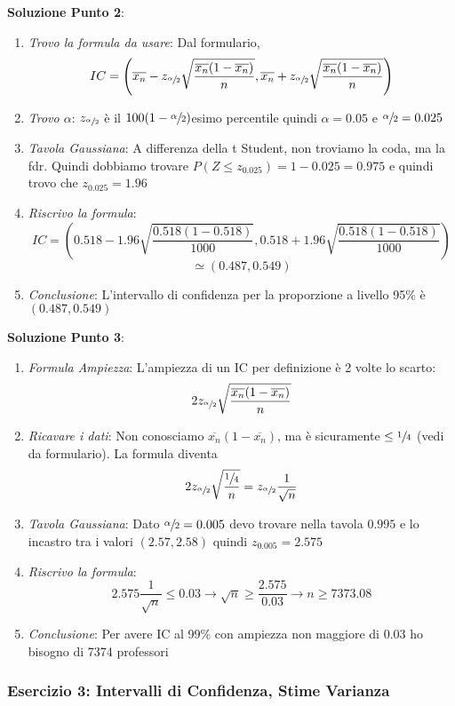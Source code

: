 \ind \textbf{Soluzione Punto 2}:
\begin{enumerate}
    \item \textit{Trovo la formula da usare}: Dal formulario, $$IC = \left(\overline{x_n} - z_{\sfrac{\alpha}{2}} \sqrt{\dfrac{\overline{x_n}(1 -\overline{x_n})}{n}}, \overline{x_n} + z_{\sfrac{\alpha}{2}} \sqrt{\dfrac{\overline{x_n}(1 -\overline{x_n})}{n}} \right)$$
    \item \textit{Trovo $\alpha$}: $z_{\sfrac{\alpha}{2}} $ è il $100(1 - \sfrac{\alpha}{2})$esimo percentile quindi $\alpha=0.05$ e $\sfrac{\alpha}{2}=0.025$
    \item \textit{Tavola Gaussiana}: A differenza della t Student, non troviamo la coda, ma la fdr. Quindi dobbiamo trovare $P( Z \leq z_{0.025}) = 1 - 0.025 = 0.975$ e quindi trovo che $z_{0.025}=1.96$
    \item \textit{Riscrivo la formula}: $$IC= \left( 0.518 - 1.96 \sqrt{\dfrac{0.518(1-0.518)}{1000}}, 0.518 + 1.96 \sqrt{\dfrac{0.518(1-0.518)}{1000}} \right)$$  $$\simeq (0.487, 0.549)$$
    \item \textit{Conclusione}: L'intervallo di confidenza per la proporzione a livello 95\% è $(0.487, 0.549)$
\end{enumerate}

\ind \textbf{Soluzione Punto 3}:
\begin{enumerate}
    \item \textit{Formula Ampiezza}: L'ampiezza di un IC per definizione è 2 volte lo scarto:  $$2 z_{\sfrac{\alpha}{2}} \sqrt{\dfrac{\overline{x_n}(1 -\overline{x_n})}{n}}$$ 
    \item \textit{Ricavare i dati}: Non conosciamo $\overline{x_n}(1 -\overline{x_n})$, ma è sicuramente $\leq \sfrac{1}{4}$ (vedi da formulario). La formula diventa $$2 z_{\sfrac{\alpha}{2}} \sqrt{\dfrac{\sfrac{1}{4}}{n}} = z_{\sfrac{\alpha}{2}} \frac{1}{\sqrt{n}} $$
    \item \textit{Tavola Gaussiana}: Dato $\sfrac{\alpha}{2}=0.005$ devo trovare nella tavola $0.995$ e lo incastro tra i valori $(2.57, 2.58)$ quindi $z_{0.005}=2.575$
    \item \textit{Riscrivo la formula}: $$ 2.575 \frac{1}{\sqrt{n}} \leq 0.03 \xrightarrow{} \sqrt{n} \geq \dfrac{2.575}{0.03} \xrightarrow{} n \geq 7373.08$$
    \item \textit{Conclusione}: Per avere IC al 99\% con ampiezza non maggiore di 0.03 ho bisogno di 7374 professori
\end{enumerate}

\subsubsection{Esercizio 3: Intervalli di Confidenza, Stime Varianza}

